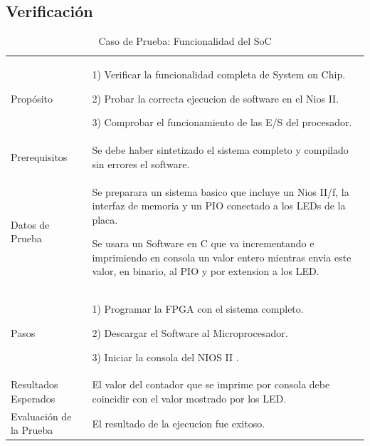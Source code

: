 \subsection{Verificación}
\newpage
\begin{table}
	\begin{tabular}{|>{\columncolor[gray]{0.8}}l|p{9cm}|} \hline
\multicolumn{2}{|>{\columncolor[gray]{0.8}}l|}{\textbf{Caso de Prueba: Funcionalidad del SoC}}\\ \hline
Propósito  & 1) Verificar la funcionalidad completa de System on Chip. 

2) Probar la correcta ejecucion de software en el Nios II.

3) Comprobar el funcionamiento de las E/S del procesador. 
\\ \hline
 Prerequisitos  & Se debe haber sintetizado el sistema completo y compilado sin errores el software.\\ \hline
 Datos de Prueba & Se preparara un sistema basico que incluye un Nios II/f, la interfaz de memoria y un PIO conectado a los LEDs de la placa.

Se usara un Software en C que va incrementando e imprimiendo en consola un valor entero mientras envia este valor, en binario, al PIO y por extension a los LED.  \\ \hline
 Pasos & 1) Programar la FPGA con el sistema completo.

2) Descargar el Software al Microprocesador.

3) Iniciar la consola del NIOS II .\\ \hline
 Resultados Esperados & El valor del contador que se imprime por consola debe coincidir con el valor mostrado por los LED.\\ \hline
 Evaluación de la Prueba  & El resultado de la ejecucion fue exitoso. \\ \hline
	\end{tabular}
	\caption{Caso de Prueba: Funcionalidad del SoC}
	\label{tab:testsoc}
\end{table}

